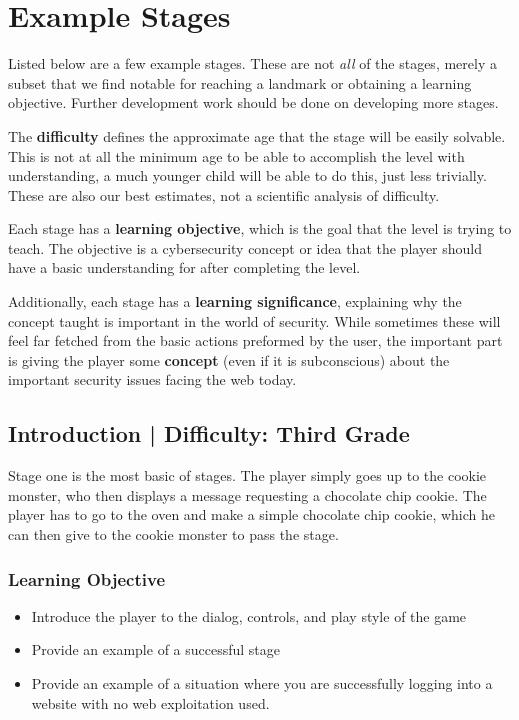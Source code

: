 \documentclass{article}
\begin{document}
\section{Example Stages}

Listed below are a few example stages. These are not \textit{all} of
the stages, merely a subset that we find notable for reaching a
landmark or obtaining a learning objective. Further development work
should be done on developing more stages.

The \textbf{difficulty} defines the approximate age that the stage
will be easily solvable. This is not at all the minimum age to be able to accomplish
the level with understanding, a much younger child will be able to do
this, just less trivially. These are also our best estimates, not a
scientific analysis of difficulty.

Each stage has a \textbf{learning objective}, which is the goal that
the level is trying to teach. The objective is a cybersecurity concept or
idea that the player should have a basic understanding for after completing the level.

Additionally, each stage has a \textbf{learning significance},
explaining why the concept taught is important in the world of
security. While sometimes these will feel far fetched from the basic
actions preformed by the user, the important part is giving the player
some \textbf{concept} (even if it is subconscious) about the important security
issues facing the web today.

\subsection{Introduction | Difficulty: Third Grade}

Stage one is the most basic of stages. The player simply goes up to
the cookie monster, who then displays a message requesting a chocolate
chip cookie. The player has to go to the oven and make a simple
chocolate chip cookie, which he can then give to the cookie monster to pass the stage.

\subsubsection{Learning Objective}

\begin{itemize}

  \item Introduce the player to the dialog, controls, and play style of
the game
  \item Provide an example of a successful stage
  \item Provide an example of a situation where you are successfully
logging into a website with no web exploitation used.
\end{itemize}
\end{document}
